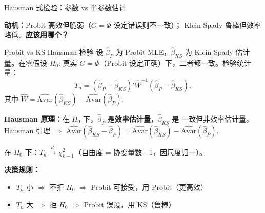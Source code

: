 \documentclass[aspectratio=169, 10pt]{beamer}
\begin{document}
\begin{frame}[shrink=10]{Hausman 式检验：参数 vs 半参数估计}

  \textbf{动机：}Probit 高效但脆弱（$G = \Phi$ 设定错误则不一致）；
  Klein-Spady 鲁棒但效率略低。\textbf{应该用哪个？}

  \begin{definitionbox}{{Probit vs KS Hausman 检验}}
    设 $\hat\beta_P$ 为 Probit MLE，$\hat\beta_{KS}$ 为 Klein-Spady 估计量。在零假设
    $H_0$: 真实 $G = \Phi$（Probit 设定正确）下，二者都一致。检验统计量：
    $$T_n = (\hat\beta_P - \hat\beta_{KS})' \hat W^{-1} (\hat\beta_P - \hat\beta_{KS}),$$
    其中 $\hat W = \widehat{\text{Avar}}(\hat\beta_{KS}) - \widehat{\text{Avar}}(\hat\beta_P)$.
  \end{definitionbox}

  \begin{highlightbox}
    \textbf{Hausman 原理：}在 $H_0$ 下，$\hat\beta_P$ 是\textbf{效率估计量}，$\hat\beta_{KS}$ 是
    一致但非效率估计量。Hausman 引理 $\Rightarrow$ $\widehat{\text{Avar}}(\hat\beta_{KS} - \hat\beta_P) = \widehat{\text{Avar}}(\hat\beta_{KS}) - \widehat{\text{Avar}}(\hat\beta_P)$.

    在 $H_0$ 下：$T_n \overset{d}{\to} \chi^2_{k-1}$（自由度 = 协变量数 - 1，因尺度归一）。
  \end{highlightbox}

  \begin{keybox}
    \textbf{决策规则：}
    \begin{itemize}\setlength{\itemsep}{1pt}
      \item $T_n$ 小 $\Rightarrow$ 不拒 $H_0$ $\Rightarrow$ Probit 可接受，用 Probit（更高效）
      \item $T_n$ 大 $\Rightarrow$ 拒 $H_0$ $\Rightarrow$ Probit 误设，用 KS（鲁棒）
    \end{itemize}
  \end{keybox}

\end{frame}
\end{document}

